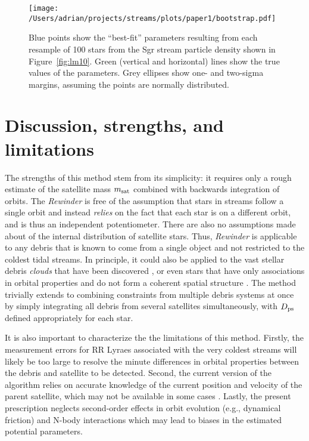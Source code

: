\documentclass{emulateapj}
\begin{document}
\begin{figure*}[!t]
\centering\texttt{[image: /Users/adrian/projects/streams/plots/paper1/bootstrap.pdf]}
\caption{ Blue points show the ``best-fit'' parameters resulting from each resample of 100 stars from the Sgr stream particle density shown in Figure~\ref{fig:lm10}. Green (vertical and horizontal) lines show the true values of the parameters. Grey ellipses show one- and two-sigma margins, assuming the points are normally distributed. }\label{fig:bootstrap}
\end{figure*}	

\section{Discussion, strengths, and limitations}
\label{sec:discussion}

The strengths of this method stem from its simplicity: it requires
only a rough estimate of the satellite mass $m_{\rm sat}$ combined
with backwards integration of orbits. 
The \emph{Rewinder} is free of the assumption that stars in streams follow
a single orbit and instead \emph{relies}
on the fact that each star is on a different orbit, and is thus an
independent potentiometer. There are also no assumptions made
about of the internal distribution of satellite
stars. Thus, \emph{Rewinder} is applicable to any debris that is
known to come from a single object and not restricted to the coldest
tidal streams. In principle, it could also be applied to the
vast stellar debris {\it clouds} that have been discovered 
\citep[e.g. the Triangulum Andromeda and Hercules-Aquila
  clouds]{rochapinto04,belokurov06}, or even stars that have only
associations in orbital properties and do not form a coherent spatial
structure \citep[e.g.][]{helmi99}. The method trivially extends to
combining constraints from multiple debris systems at once by simply
integrating all debris from several satellites simultaneously, with
$D_{\rm ps}$ defined appropriately for each star.

It is also important to characterize the the limitations of this
method. Firstly, the measurement errors for RR Lyraes associated with
the very coldest streams \citep[e.g., the globular clusters Pal5 and
  GD1;][]{odenkirchen02,koposov10} will likely be too large to resolve
the minute differences in orbital properties between the debris and
satellite to be detected. Second, the current version of the algorithm
relies on accurate knowledge of the current position and velocity of
the parent satellite, which may not be available in some cases
\citep[for example, the Orphan Stream;][]{belokurov07}. Lastly, the
present prescription neglects second-order effects in orbit evolution (e.g.,
dynamical friction) and N-body interactions which may lead to biases in
the estimated potential parameters.
\end{document}
